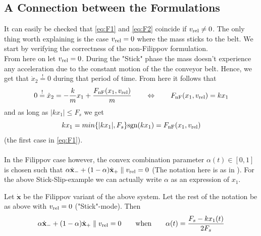 \subsection{A Connection between the Formulations}
It can easily be checked that \autoref{eq:F1} and \autoref{eq:F2} coincide if $v_{\text{rel}} \neq 0$. The only thing worth explaining is the case $v_{\text{rel}} = 0$ where the mass sticks to the belt. We start by verifying the correctness of the non-Filippov formulation.\\ From here on let $v_{\text{rel}} = 0$.
During the "Stick" phase the mass doesn't experience any acceleration due to the constant motion of the the conveyor belt. Hence, we get that $\dot{x}_2 \overset{!}{=} 0$ during that period of time. From here it follows that
\begin{align*}
	0 \overset{!}{=} \dot{x}_2 = - \frac{k}{m}x_1 + \frac{F_{\text{nF}}(x_1, v_{\text{rel}})}{m}  \hspace{20pt}
	\Leftrightarrow \hspace{20pt} F_{\text{nF}}(x_1, v_{\text{rel}}) = kx_1
\end{align*}
and as long as $|kx_1| \leq F_s$ we get $$ kx_1 = min\{ |kx_1|, F_s \} \text{sgn}(kx_1) = F_{\text{nF}}(x_1, v_{\text{rel}}) $$ (the first case in \autoref{eq:F1}).
\\ \\
In the Filippov case however, the convex combination parameter $\alpha(t) \in [0, 1]$ is chosen such that $ \alpha \dot{\mathbf{x}}_- + (1-\alpha)\dot{\mathbf{x}}_+ \parallel v_{\text{rel}} = 0 $ (The notation here is as in \autocite{meyer2020numerical}). For the above Stick-Slip-example we can actually write $\alpha$ as an expression of $x_1$.
\begin{lemma} \label{lemma:alpha}
	Let $\dot{\mathbf{x}}$ be the Filippov variant of the above system. Let the rest of the notation be as above with $v_{\text{rel}}=0$ ("Stick"-mode). Then
	\begin{align*}
		\alpha \dot{\mathbf{x}}_- + (1-\alpha)\dot{\mathbf{x}}_+ \parallel v_{\text{rel}} = 0 \hspace{20pt} \text{when} \hspace{20pt} \alpha(t) = \frac{F_s - kx_1(t)}{2F_s}
	\end{align*}
\end{lemma}
